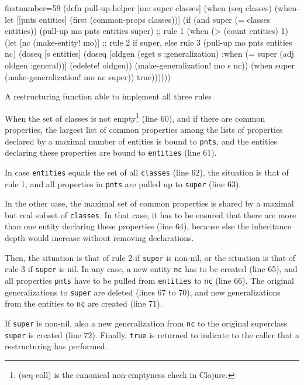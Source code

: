 \documentclass[11pt]{article}
\begin{document}
\begin{listing}[htbp]
  \begin{clojurecode*}{firstnumber=59}
(defn pull-up-helper [mo super classes]
  (when (seq classes)
    (when-let [[pnts entities] (first (common-props classes))]
      (if (and super (= classes entities))
        (pull-up mo pnts entities super)  ;; rule 1
        (when (> (count entities) 1)
          (let [nc (make-entity! mo)]     ;; rule 2 if super, else rule 3
            (pull-up mo pnts entities nc)
            (doseq [s entities]
              (doseq [oldgen (eget s :generalization)
                      :when (= super (adj oldgen :general))]
                (edelete! oldgen))
              (make-generalization! mo s nc))
            (when super (make-generalization! mo nc super))
            true))))))
  \end{clojurecode*}
  \caption{A restructuring function able to implement all three rules}
  \label{lst:pull-up-helper}
\end{listing}

When the set of classes is not empty\footnote{\textsf{(seq coll)} is the
  canonical non-emptyness check in Clojure.} (line 60), and if there are common
properties, the largest list of common properties among the lists of properties
declared by a maximal number of entities is bound to \verb|pnts|, and the
entities declaring these properties are bound to \verb|entities| (line 61).

In case \verb|entities| equals the set of all \verb|classes| (line 62), the
situation is that of rule 1, and all properties in \verb|pnts| are pulled up to
\verb|super| (line 63).

In the other case, the maximal set of common properties is shared by a maximal
but real subset of \verb|classes|.  In that case, it has to be ensured that
there are more than one entity declaring these properties (line 64), because
else the inheritance depth would increase without removing declarations.

Then, the situation is that of rule 2 if \verb|super| is non-nil, or the
situation is that of rule 3 if \verb|super| is nil.  In any case, a new entity
\verb|nc| has to be created (line 65), and all properties \verb|pnts| have to
be pulled from \verb|entities| to \verb|nc| (line 66).  The original
generalizations to \verb|super| are deleted (lines 67 to 70), and new
generalizations from the entities to \verb|nc| are created (line 71).

If \verb|super| is non-nil, also a new generalization from \verb|nc| to the
original superclass \verb|super| is created (line 72).  Finally, \verb|true| is
returned to indicate to the caller that a restructuring has performed.
\end{document}
